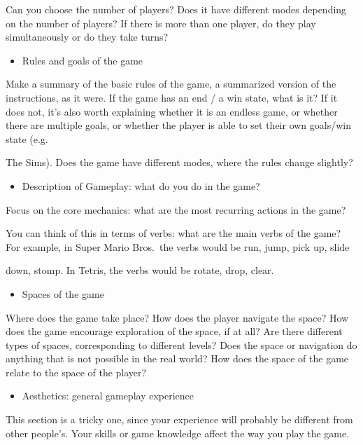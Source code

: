 \documentclass[
]{book}
\providecommand{\tightlist}{%
  \setlength{\itemsep}{0pt}\setlength{\parskip}{0pt}}
\begin{document}
Can you choose the number of players? Does it have different modes depending
on the number of players? If there is more than one player, do they play
simultaneously or do they take turns?

\begin{itemize}
\tightlist
\item
  Rules and goals of the game
\end{itemize}

Make a summary of the basic rules of the game, a summarized version of the
instructions, as it were. If the game has an end / a win state, what is it? If it does
not, it's also worth explaining whether it is an endless game, or whether there are
multiple goals, or whether the player is able to set their own goals/win state (e.g.

The Sims). Does the game have different modes, where the rules change slightly?

\begin{itemize}
\tightlist
\item
  Description of Gameplay: what do you do in the game?
\end{itemize}

Focus on the core mechanics: what are the most recurring actions in the game?

You can think of this in terms of verbs: what are the main verbs of the game? For
example, in Super Mario Bros.~the verbs would be run, jump, pick up, slide

down, stomp. In Tetris, the verbs would be rotate, drop, clear.

\begin{itemize}
\tightlist
\item
  Spaces of the game
\end{itemize}

Where does the game take place? How does the player navigate the space? How
does the game encourage exploration of the space, if at all? Are there different
types of spaces, corresponding to different levels? Does the space or navigation
do anything that is not possible in the real world? How does the space of the
game relate to the space of the player?

\begin{itemize}
\tightlist
\item
  Aesthetics: general gameplay experience
\end{itemize}

This section is a tricky one, since your experience will probably be different from
other people's. Your skills or game knowledge affect the way you play the game.
\end{document}
